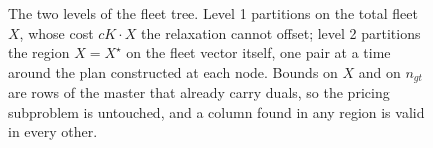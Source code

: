 \begin{figure}[h!]
{}
\caption{The two levels of the fleet tree. Level 1 partitions on the
total fleet $X$, whose cost $cK\cdot X$ the relaxation cannot offset;
level 2 partitions the region $X=X^{\star}$ on the fleet vector itself,
one pair at a time around the plan constructed at each node. Bounds on
$X$ and on $n_{gt}$ are rows of the master that already carry duals,
so the pricing subproblem is untouched, and a column found in any
region is valid in every other.}
\label{fig:branching}
\end{figure}
